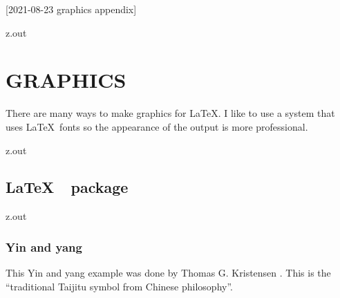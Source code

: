 [2021-08-23 graphics appendix]

\begin{VerbatimOut}{z.out}
\chapter{GRAPHICS}

There are many ways to make graphics for \LaTeX.
I like to use a system that uses \LaTeX\ fonts
so the appearance of the output is more professional.
\end{VerbatimOut}

\MyIO


\begin{VerbatimOut}{z.out}


\section{\LaTeX\ \TikZLogo\ package}
\end{VerbatimOut}

\MyIO


\begin{VerbatimOut}{z.out}


\subsection{Yin and yang}

This Yin and yang example was done by Thomas G. Kristensen \cite{kristensen}.
This is the ``traditional Taijitu symbol from Chinese philosophy''.\\

\end{VerbatimOut}

